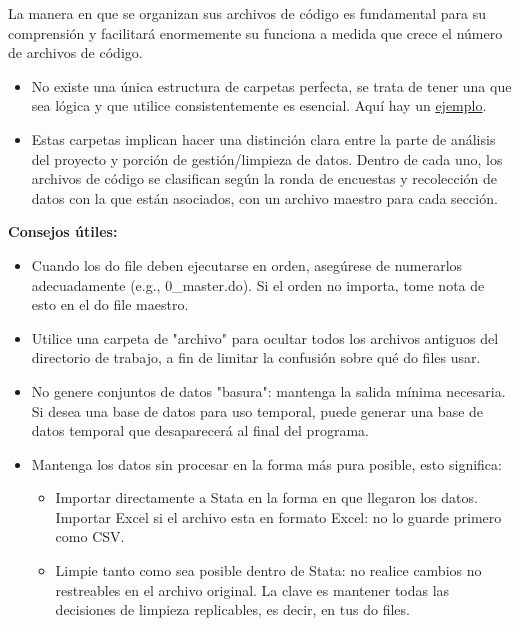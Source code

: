 \documentclass[11pt,en]{elegantpaper}
\begin{document}
La manera en que se organizan sus archivos de código es fundamental para su comprensión y facilitará enormemente su
funciona a medida que crece el número de archivos de código.

\begin{itemize}
	\item No existe una única estructura de carpetas perfecta, se trata de tener una que sea lógica y que utilice consistentemente es esencial. Aquí hay un \hyperref[fig:carpetas]{ejemplo}.
	
	\item Estas carpetas implican hacer una distinción clara entre la parte de análisis del proyecto y porción de gestión/limpieza de datos. Dentro de cada uno, los archivos de código se clasifican según la ronda de encuestas y recolección de datos con la que están asociados, con un archivo maestro para cada sección.
\end{itemize}

\textbf{Consejos útiles:}

	\begin{itemize}
		\item Cuando los do file deben ejecutarse en orden, asegúrese de numerarlos adecuadamente (e.g., 0\_master.do). Si el orden no importa, tome nota de esto en el do file maestro.
		
		\item Utilice una carpeta de "archivo" para ocultar todos los archivos antiguos del directorio de trabajo, a fin de limitar la confusión sobre qué do files usar.
		
		\item No genere conjuntos de datos "basura": mantenga la salida mínima necesaria. Si desea una base de datos para uso temporal, puede generar una base de datos temporal que desaparecerá al final del programa.
		
		\item Mantenga los datos sin procesar en la forma más pura posible, esto significa:
		
		\begin{itemize}
		  \item Importar directamente a Stata en la forma en que llegaron los datos. Importar Excel si el archivo esta en formato Excel: no lo guarde primero como CSV.
		  
		  \item Limpie tanto como sea posible dentro de Stata: no realice cambios no restreables en el archivo original. La clave es mantener todas las decisiones de limpieza replicables, es decir, en tus do files.
		\end{itemize}
	
\end{itemize}
\end{document}
